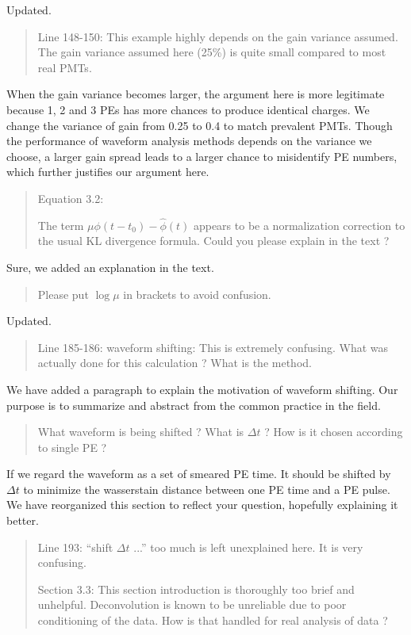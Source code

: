 \documentclass[12pt]{article}
\begin{document}
Updated.

\begin{quote}
Line 148-150: This example highly depends on the gain variance assumed. The gain variance assumed here (25\%) is quite small compared to most real PMTs.
\end{quote}

When the gain variance becomes larger, the argument here is more legitimate because 1, 2 and 3 PEs has more chances to produce identical charges. We change the variance of gain from 0.25 to 0.4 to match prevalent PMTs. Though the performance of waveform analysis methods depends on the variance we choose, a larger gain spread leads to a larger chance to misidentify PE numbers, which further justifies our argument here.

\begin{quote}
Equation 3.2:

The term $\mu\phi(t-t_0)-\hat{\phi}(t)$ appears to be a normalization correction to the usual KL divergence formula. Could you please explain in the text ?
\end{quote}

Sure, we added an explanation in the text.

\begin{quote}
Please put $\log\mu$ in brackets to avoid confusion.
\end{quote}

Updated.

\begin{quote}
Line 185-186: waveform shifting: This is extremely confusing. What was actually done for this calculation ? What is the method. 
\end{quote}

We have added a paragraph to explain the motivation of waveform shifting.  Our purpose is to summarize and abstract from the common practice in the field. 

\begin{quote}
What waveform is being shifted ? What is $\Delta t$ ? How is it chosen according to single PE ?
\end{quote}

If we regard the waveform as a set of smeared PE time. It should be shifted by $\Delta t$ to minimize the wasserstain distance between one PE time and a PE pulse. We have reorganized this section to reflect your question, hopefully explaining it better.

\begin{quote}
Line 193: ``shift $\Delta t$ ...'' too much is left unexplained here. It is very confusing.

Section 3.3: This section introduction is thoroughly too brief and unhelpful. Deconvolution is known to be unreliable due to poor conditioning of the data. How is that handled for real analysis of data ?
\end{quote}
\end{document}
